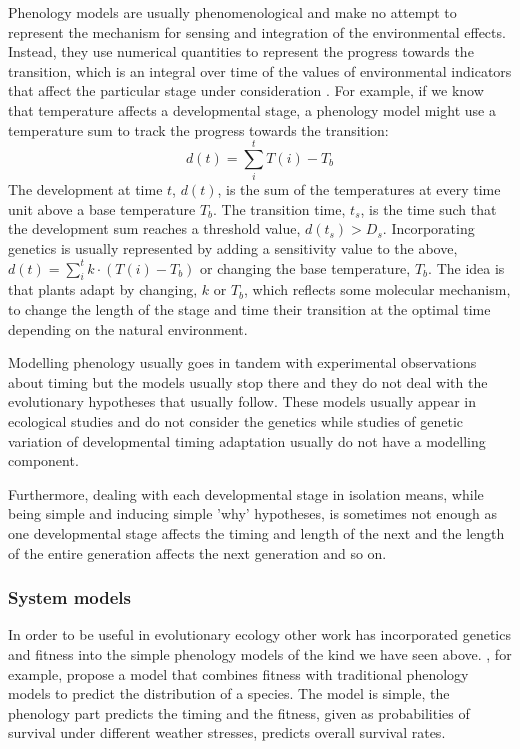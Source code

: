 Phenology models are usually phenomenological and make no attempt to represent
the mechanism for sensing and integration of the environmental effects. Instead,
they use numerical quantities to represent the progress towards the transition,
which is an integral over time of the values of environmental indicators that
affect the particular stage under consideration \citep{chuine_plant_2013}. For
example, if we know that temperature affects a developmental stage, a phenology
model might use a temperature sum to track the progress towards the transition:
$$
d(t) = \sum_{i}^{t} T(i) - T_b
$$
The development at time $t$, $d(t)$, is the sum of the temperatures at every
time unit above a base temperature $T_b$. The transition time, $t_s$, is the
time such that the development sum reaches a threshold value, $d(t_s) >
D_s$. Incorporating genetics is usually represented by adding a sensitivity value
to the above, $ d(t) = \sum_{i}^{t} k \cdot (T(i) - T_b)$ or changing the base temperature,
$T_b$. The idea is that plants adapt by changing, $k$ or $T_b$, which reflects
some molecular mechanism, to change the length of the stage and time their
transition at the optimal time depending on the natural environment.

Modelling phenology usually goes in tandem with experimental observations about
timing but the models usually stop there and they do not deal with the
evolutionary hypotheses that usually follow. These models usually appear in
ecological studies and do not consider the genetics while studies of genetic
variation of developmental timing adaptation usually do not have a modelling
component.

Furthermore, dealing with each developmental stage in isolation means, while
being simple and inducing simple 'why' hypotheses, is sometimes not enough as one
developmental stage affects the timing and length of the next and the length of
the entire generation affects the next generation and so on.

\subsubsection*{System models}
In order to be useful in evolutionary ecology other work has incorporated
genetics and fitness into the simple phenology models of the kind we have seen
above. \citet{chuine_phenology_2001}, for example, propose a model that combines
fitness with traditional phenology models to predict the distribution of a
species. The model is simple, the phenology part predicts the timing and the
fitness, given as probabilities of survival under different weather stresses,
predicts overall survival rates.

